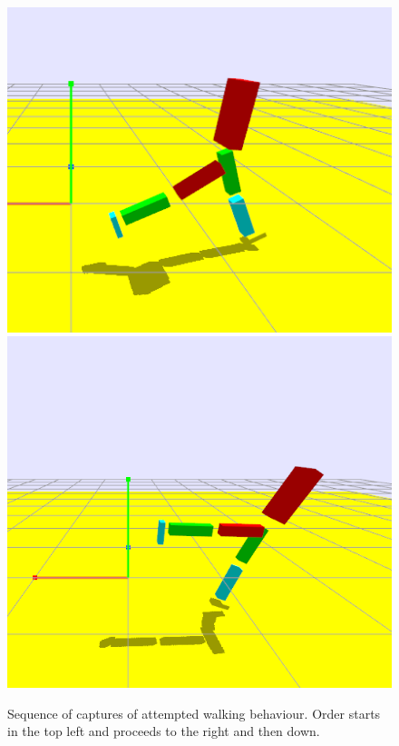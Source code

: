 \begin{figure}[!htb]
	\includegraphics[width=0.45\linewidth]{../images/stepping/step-4.png}  
	\includegraphics[width=0.45\linewidth]{../images/stepping/step-5.png}

	\caption{\label{figure:algorithm-steps} Sequence of captures of attempted walking behaviour. Order starts in the top left and proceeds to the right and then down.}
	\end{figure}
	
	\begin{figure}
		
	\end{figure}
